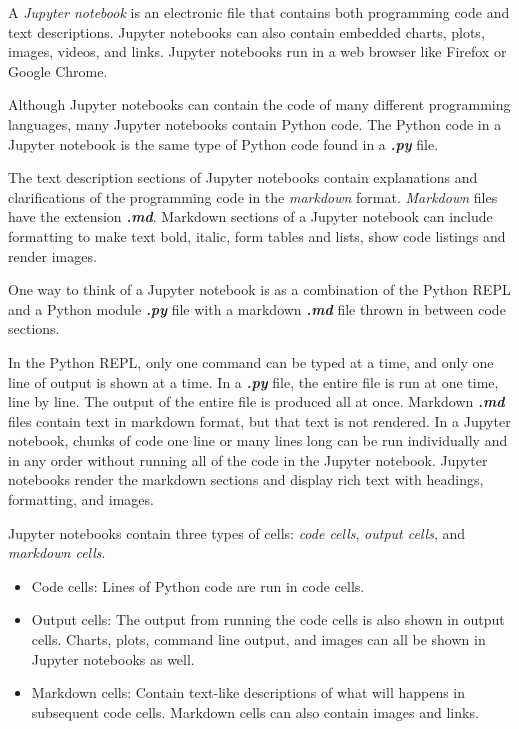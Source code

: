 \documentclass{book}
\begin{document}
    
        A \emph{Jupyter notebook} is an electronic file that contains both
programming code and text descriptions. Jupyter notebooks can also
contain embedded charts, plots, images, videos, and links. Jupyter
notebooks run in a web browser like Firefox or Google Chrome.
    




    
        Although Jupyter notebooks can contain the code of many different
programming languages, many Jupyter notebooks contain Python code. The
Python code in a Jupyter notebook is the same type of Python code found
in a \textbf{\emph{.py}} file.

The text description sections of Jupyter notebooks contain explanations
and clarifications of the programming code in the \emph{markdown}
format. \emph{Markdown} files have the extension \textbf{\emph{.md}}.
Markdown sections of a Jupyter notebook can include formatting to make
text bold, italic, form tables and lists, show code listings and render
images.
    




    
        One way to think of a Jupyter notebook is as a combination of the Python
REPL and a Python module \textbf{\emph{.py}} file with a markdown
\textbf{\emph{.md}} file thrown in between code sections.

In the Python REPL, only one command can be typed at a time, and only
one line of output is shown at a time. In a \textbf{\emph{.py}} file,
the entire file is run at one time, line by line. The output of the
entire file is produced all at once. Markdown \textbf{\emph{.md}} files
contain text in markdown format, but that text is not rendered. In a
Jupyter notebook, chunks of code one line or many lines long can be run
individually and in any order without running all of the code in the
Jupyter notebook. Jupyter notebooks render the markdown sections and
display rich text with headings, formatting, and images.
    




    
        Jupyter notebooks contain three types of cells: \emph{code cells},
\emph{output cells}, and \emph{markdown cells}.

\begin{itemize}
\item
  Code cells: Lines of Python code are run in code cells.
\item
  Output cells: The output from running the code cells is also shown in
  output cells. Charts, plots, command line output, and images can all
  be shown in Jupyter notebooks as well.
\item
  Markdown cells: Contain text-like descriptions of what will happens in
  subsequent code cells. Markdown cells can also contain images and
  links.
\end{itemize}
    
\end{document}
